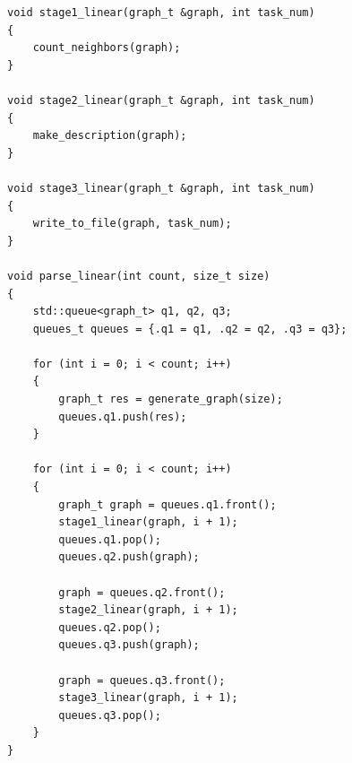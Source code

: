 \clearpage

\begin{lstlisting}[label=lst:linear, caption=Реализация линейного алгоритма]
void stage1_linear(graph_t &graph, int task_num)
{
    count_neighbors(graph);
}

void stage2_linear(graph_t &graph, int task_num)
{   
    make_description(graph);
}

void stage3_linear(graph_t &graph, int task_num)
{   
    write_to_file(graph, task_num);
}

void parse_linear(int count, size_t size)
{
    std::queue<graph_t> q1, q2, q3;
    queues_t queues = {.q1 = q1, .q2 = q2, .q3 = q3};

    for (int i = 0; i < count; i++)
    {
        graph_t res = generate_graph(size);
        queues.q1.push(res);
    }

    for (int i = 0; i < count; i++)
    {
        graph_t graph = queues.q1.front();
        stage1_linear(graph, i + 1);
        queues.q1.pop();
        queues.q2.push(graph);

        graph = queues.q2.front();
        stage2_linear(graph, i + 1);
        queues.q2.pop();
        queues.q3.push(graph);

        graph = queues.q3.front();
        stage3_linear(graph, i + 1);
        queues.q3.pop();
    }
}
\end{lstlisting}
\clearpage

